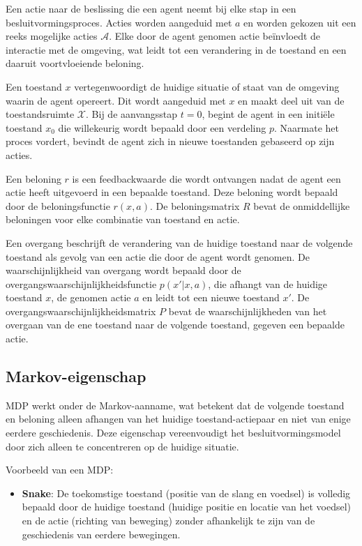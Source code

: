 \documentclass[a4paper,12pt]{report}
\begin{document}
Een actie naar de beslissing die een agent neemt bij elke stap in een
besluitvormingsproces. Acties worden aangeduid met \( a \) en worden gekozen
uit een reeks mogelijke acties \( \mathcal{A} \). Elke door de agent genomen
actie beïnvloedt de interactie met de omgeving, wat leidt tot een verandering
in de toestand en een daaruit voortvloeiende beloning.

Een toestand \( x \) vertegenwoordigt de huidige situatie of staat van de
omgeving waarin de agent opereert. Dit wordt aangeduid met \( x \) en maakt
deel uit van de toestandsruimte \( \mathcal{X} \). Bij de aanvangsstap \( t = 0
\), begint de agent in een initiële toestand \( x_0 \) die willekeurig wordt
bepaald door een verdeling \( p \). Naarmate het proces vordert, bevindt de
agent zich in nieuwe toestanden gebaseerd op zijn acties.

Een beloning \( r \) is een feedbackwaarde die wordt ontvangen nadat de agent
een actie heeft uitgevoerd in een bepaalde toestand. Deze beloning wordt
bepaald door de beloningsfunctie \( r(x, a) \). De beloningsmatrix \( R \)
bevat de onmiddellijke beloningen voor elke combinatie van toestand en actie.

Een overgang beschrijft de verandering van de huidige toestand naar de volgende
toestand als gevolg van een actie die door de agent wordt genomen. De
waarschijnlijkheid van overgang wordt bepaald door de
overgangswaarschijnlijkheidsfunctie \( p(x'|x, a) \), die afhangt van de
huidige toestand \( x \), de genomen actie \( a \) en leidt tot een nieuwe
toestand \( x' \). De overgangswaarschijnlijkheidsmatrix \( P \) bevat de
waarschijnlijkheden van het overgaan van de ene toestand naar de volgende
toestand, gegeven een bepaalde actie.

\subsection*{Markov-eigenschap}

MDP werkt onder de Markov-aanname, wat betekent dat de volgende toestand en
beloning alleen afhangen van het huidige toestand-actiepaar en niet van enige
eerdere geschiedenis. Deze eigenschap vereenvoudigt het besluitvormingsmodel
door zich alleen te concentreren op de huidige situatie.

Voorbeeld van een MDP:
\begin{itemize}
    \item \textbf{Snake}: De toekomstige toestand (positie van de slang en voedsel) is volledig bepaald door de huidige toestand (huidige positie en locatie van het voedsel) en de actie (richting van beweging) zonder afhankelijk te zijn van de geschiedenis van eerdere bewegingen.
\end{itemize}
\end{document}
